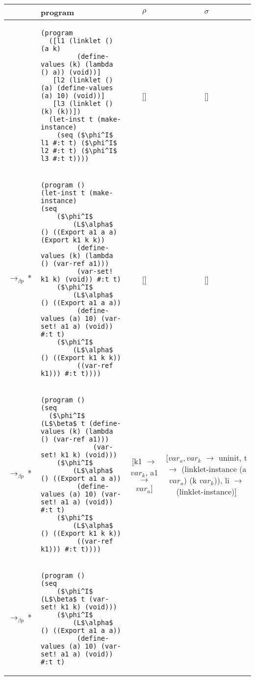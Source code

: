 \begin{table}[!htbp]
  \footnotesize
  \begin{tabular}{l >{\centering\arraybackslash}m{} c c}  %
	&\textbf{program} & \textbf{$\rho$} & \textbf{$\sigma$} \\ \hline \hline
	&\begin{lstlisting}[style=numberless]
(program
  ([l1 (linklet () (a k)
         (define-values (k) (lambda () a)) (void))]
   [l2 (linklet () (a) (define-values (a) 10) (void))]
   [l3 (linklet () (k) (k))])
  (let-inst t (make-instance)
    (seq ($\phi^I$ l1 #:t t) ($\phi^I$ l2 #:t t) ($\phi^I$ l3 #:t t))))\end{lstlisting} & [] & [] \\ \hline
	$\longrightarrow_{\beta p}*$&\begin{lstlisting}[style=numberless]
(program ()
(let-inst t (make-instance)
(seq
	($\phi^I$
		(L$\alpha$ () ((Export a1 a a) (Export k1 k k))
		 (define-values (k) (lambda () (var-ref a1)))
		 (var-set! k1 k) (void)) #:t t)
	($\phi^I$
		(L$\alpha$ () ((Export a1 a a))
		 (define-values (a) 10) (var-set! a1 a) (void)) #:t t)
	($\phi^I$
		(L$\alpha$ () ((Export k1 k k))
		 ((var-ref k1))) #:t t))))\end{lstlisting} & [] & [] \\ \hline
	$\longrightarrow_{\beta p}*$&\begin{lstlisting}[style=numberless]
(program ()
(seq
  ($\phi^I$ (L$\beta$ t (define-values (k) (lambda () (var-ref a1)))
             (var-set! k1 k) (void)))
	($\phi^I$
		(L$\alpha$ () ((Export a1 a a))
		 (define-values (a) 10) (var-set! a1 a) (void)) #:t t)
	($\phi^I$
		(L$\alpha$ () ((Export k1 k k))
		 ((var-ref k1))) #:t t))))\end{lstlisting} & \thead{[k1 $\rightarrow$ $var_k$, \\a1 $\rightarrow$ $var_a$]} & \thead{[$var_a,var_k$ $\rightarrow$ uninit,\\ t $\rightarrow$ (linklet-instance \\ (a $var_a$) (k $var_k$)), \\li $\rightarrow$ (linklet-instance)]} \\ \hline
	$\longrightarrow_{\beta p}*$&\begin{lstlisting}[style=numberless]
(program ()
(seq
	($\phi^I$ (L$\beta$ t (var-set! k1 k) (void)))
	($\phi^I$
		(L$\alpha$ () ((Export a1 a a))
		 (define-values (a) 10) (var-set! a1 a) (void)) #:t t)

\end{lstlisting}
\end{tabular}
\end{table}
